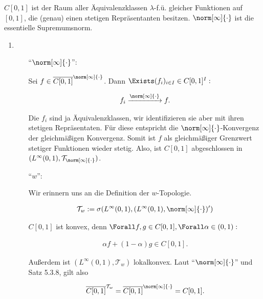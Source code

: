 \begin{solution}

$C[0, 1]$ ist der Raum aller Äquivalenzklassen $\lambda$-f.ü. gleicher Funktionen auf $[0, 1]$, die (genau) einen stetigen Repräsentanten besitzen.
$\norm[\infty]{\cdot}$ ist die essentielle Supremumsnorm.

\begin{enumerate}[label = \alph*)]

  \item
  \phantom{}

  \begin{itemize}

    \item
    [\enquote{$\norm[\infty]{\cdot}$}:]

    Sei $f \in \overline{C[0, 1]}^{\norm[\infty]{\cdot}}$.
    Dann $\Exists (f_i)_{i \in I} \in C[0, 1]^I:$

    \begin{align*}
      f_i \xrightarrow{\norm[\infty]{\cdot}} f.
    \end{align*}

    Die $f_i$ sind ja Äquivalenzklassen, wir identifizieren sie aber mit ihren stetigen Repräsentaten.
    Für diese entspricht die $\norm[\infty]{\cdot}$-Konvergenz der gleichmäßigen Konvergenz.
    Somit ist $f$ als gleichmäßiger Grenzwert stetiger Funktionen wieder stetig.
    Also, ist $C[0, 1]$ abgeschlossen in $(L^\infty(0, 1), \mathcal{T}_{\norm[\infty]{\cdot}})$.

    \item
    [\enquote{$w$}:]

    Wir erinnern uns an die Definition der $w$-Topologie.

    \begin{align*}
      \mathcal{T}_w
      :=
      \sigma
      (
        L^\infty(0,1),
        (L^\infty(0,1), \norm[\infty]{\cdot})^\prime
      )
    \end{align*}

    $C[0, 1]$ ist konvex, denn $\Forall f, g \in C[0, 1], \Forall \alpha \in (0, 1):$

    \begin{align*}
      \alpha f + (1 - \alpha) g \in C[0, 1].
    \end{align*}

    Außerdem ist $(L^\infty(0, 1), \mathcal{T}_w)$ lokalkonvex.
    Laut \enquote{$\norm[\infty]{\cdot}$} und Satz 5.3.8, gilt also

    \begin{align*}
      \overline{C[0,1]}^{\mathcal{T}_w}
      =
      \overline{C[0,1]}^{\norm[\infty]{\cdot}}
      =
      C[0, 1].
    \end{align*}


\end{itemize}
\end{enumerate}
\end{solution}
